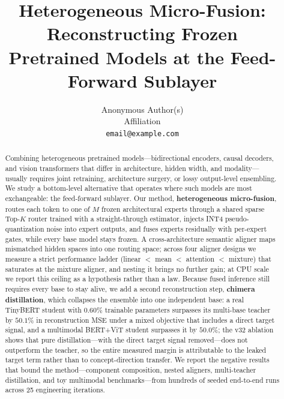 \documentclass[10pt,twoside]{article}
\title{Heterogeneous Micro-Fusion: Reconstructing Frozen\\ Pretrained Models at the Feed-Forward Sublayer}
\author{
    Anonymous Author(s)\\
    Affiliation\\
    \texttt{email@example.com}
}
\theoremstyle{definition}
\begin{document}
\maketitle

\vspace{-0.5em}
\begin{center}
\end{center}
\vspace{0.5em}

\begin{abstract}
Combining heterogeneous pretrained models---bidirectional encoders, causal decoders, and vision transformers that differ in architecture, hidden width, and modality---usually requires joint retraining, architecture surgery, or lossy output-level ensembling. We study a bottom-level alternative that operates where such models are most exchangeable: the feed-forward sublayer. Our method, \textbf{heterogeneous micro-fusion}, routes each token to one of $M$ frozen architectural experts through a shared sparse Top-$K$ router trained with a straight-through estimator, injects INT4 pseudo-quantization noise into expert outputs, and fuses experts residually with per-expert gates, while every base model stays frozen. A cross-architecture semantic aligner maps mismatched hidden spaces into one routing space; across four aligner designs we measure a strict performance ladder (linear $<$ mean $<$ attention $<$ mixture) that saturates at the mixture aligner, and nesting it brings no further gain; at CPU scale we report this ceiling as a hypothesis rather than a law. Because fused inference still requires every base to stay alive, we add a second reconstruction step, \textbf{chimera distillation}, which collapses the ensemble into one independent base: a real TinyBERT student with $0.60\%$ trainable parameters surpasses its multi-base teacher by $50.1\%$ in reconstruction MSE under a mixed objective that includes a direct target signal, and a multimodal BERT+ViT student surpasses it by $50.0\%$; the v32 ablation shows that pure distillation---with the direct target signal removed---does not outperform the teacher, so the entire measured margin is attributable to the leaked target term rather than to concept-direction transfer. We report the negative results that bound the method---component composition, nested aligners, multi-teacher distillation, and toy multimodal benchmarks---from hundreds of seeded end-to-end runs across 25 engineering iterations.
\end{abstract}
\end{document}
